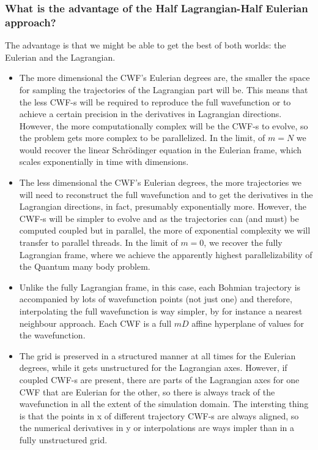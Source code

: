 \documentclass[11pt, a4paper]{article} %
\begin{document}


\subsubsection*{What is the advantage of the Half Lagrangian-Half Eulerian approach?}
The advantage is that we might be able to get the best of both worlds: the Eulerian and the Lagrangian.

\begin{itemize}
\item The more dimensional the CWF's Eulerian degrees are, the smaller the space for sampling the trajectories of the Lagrangian part will be. This means that the less CWF-s will be required to reproduce the full wavefunction or to achieve a certain precision in the derivatives in Lagrangian directions. However, the more computationally complex will be the CWF-s to evolve, so the problem gets more complex to be parallelized. In the limit, of $m=N$ we would recover the linear Schrödinger equation in the Eulerian frame, which scales exponentially in time with dimensions.

\item The less dimensional the CWF's Eulerian degrees, the more trajectories we will need to reconstruct the full wavefunction and to get the derivatives in the Lagrangian directions, in fact, presumably exponentially more. However, the CWF-s will be simpler to evolve and as the trajectories can (and must) be computed coupled but in parallel, the more of exponential complexity we will transfer to parallel threads. In the limit of $m=0$, we recover the fully Lagrangian frame, where we achieve the apparently highest parallelizability of the Quantum many body problem.

\item Unlike the fully Lagrangian frame, in this case, each Bohmian trajectory is accompanied by lots of wavefunction points (not just one) and therefore, interpolating the full wavefunction is way simpler, by for instance a nearest neighbour approach. Each CWF is a full $mD$ affine hyperplane of values for the wavefunction.

\item The grid is preserved in a structured manner at all times for the Eulerian degrees, while it gets unstructured for the Lagrangian axes. However, if coupled CWF-s are present, there are parts of the Lagrangian axes for one CWF that are Eulerian for the other, so there is always track of the wavefunction in all the extent of the simulation domain. The intersting thing is that the points in x of different trajectory CWF-s are always aligned, so the numerical derivatives in y or interpolations are ways impler than in a fully unstructured grid.


\end{itemize}
\end{document}
